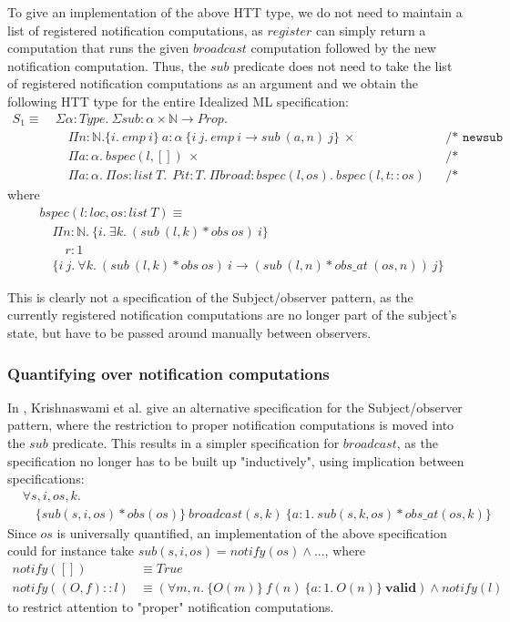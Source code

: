 \documentclass[a4paper,english]{article}
\newcommand{\N}[0]{\mathbb{N}}
\newcommand{\HPROP}[0]{Prop}
\newcommand{\TYPE}[0]{Type}
\newcommand{\LIST}[0]{list}
\newcommand{\LOC}[0]{loc}
\newcommand{\TRUE}[0]{True}
\newcommand{\VALID}[0]{\mathbf{valid}}
\newcommand{\pname}[1]{\texttt{/* #1 */}}
\begin{document}
To give an implementation of the above HTT type, we do not need to maintain a
list of registered notification computations, as $register$ can simply return a
computation that runs the given $broadcast$ computation followed by the new
notification computation. Thus, the $sub$ predicate does not need to take the
list of registered notification computations as an argument and we obtain the
following HTT type for the entire Idealized ML specification:
\begin{align*}
S_1 \equiv\ &\Sigma \alpha : \TYPE.\ \Sigma sub : \alpha \times \N \rightarrow \HPROP.\\
&\quad \Pi n : \N. \{ i.\ emp\ i\}\ a : \alpha\ \{i\ j.\ emp\ i \rightarrow sub\ (a, n)\ j \}\ \times && \pname{newsub}\\
&\quad \Pi a : \alpha.\ bspec(l, [])\ \times && \pname{broadcast}\\
&\quad \Pi a : \alpha.\ \Pi os : \LIST\ T.\ \ Pi t : T.\ \Pi broad : bspec(l, os).\ bspec(l, t::os) && \pname{register}
\end{align*}
where
\begin{align*}
& bspec(l : \LOC, os : \LIST\ T) \equiv\\
&\quad \Pi n : \N.\ \{ i.\ \exists k.\ (sub\ (l, k) * obs\ os)\ i \}\\
&\quad\quad r : 1\\
&\quad \{ i\ j.\ \forall k.\ (sub\ (l, k) * obs\ os)\ i \rightarrow (sub\ (l, n) * obs\_at\ (os, n))\ j \}
\end{align*}

This is clearly not a specification of the Subject/observer pattern, as the
currently registered notification computations are no longer part of the
subject's state, but have to be passed around manually between observers. 

\subsubsection{Quantifying over notification computations}

In \cite{patterns}, Krishnaswami et al. give an alternative specification for
the Subject/observer pattern, where the restriction to proper notification
computations is moved into the $sub$ predicate. This results in a simpler
specification for $broadcast$, as the specification no longer has to be built
up "inductively", using implication between specifications:
\begin{align*}
&\forall s, i, os, k.\\
&\quad\{ sub(s, i, os) * obs(os) \}\ broadcast(s, k)\ \{ a : 1.\ sub(s, k, os)
* obs\_at(os, k) \}
\end{align*}
Since $os$ is universally quantified, an implementation of the above specification could for instance take $sub(s, i, os) = notify(os) \land ...$, where
\begin{align*}
notify([]) &\equiv \TRUE\\
notify((O, f)::l) &\equiv (\forall m, n.\ \{ O(m) \}\ f(n)\ \{ a : 1.\ O(n) \}\ \VALID) \land notify(l)
\end{align*}
to restrict attention to "proper" notification computations. 
\end{document}
